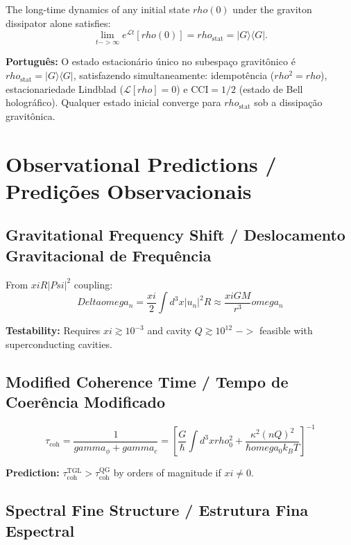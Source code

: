 \documentclass[12pt,a4paper]{article}
\def\Psi{Psi}%
\def\to{ -> }%
\def\gamma{gamma}%
\def\xi{xi}%
\def\rho{rho}%
\def\omega{omega}%
\def\Delta{Delta}%
\begin{document}
The long-time dynamics of any initial state $\rho(0)$ under the graviton dissipator alone satisfies:
\begin{equation}
\lim_{t\to\infty} e^{\mathcal{L}t}[\rho(0)] = \rho_{\mathrm{stat}} = |G\rangle\langle G|.
\end{equation}

\textbf{Português:} O estado estacionário único no subespaço gravitônico é $\rho_{\text{stat}} = |G\rangle\langle G|$, satisfazendo simultaneamente: idempotência ($\rho^2=\rho$), estacionariedade Lindblad ($\mathcal{L}[\rho]=0$) e CCI$=1/2$ (estado de Bell holográfico). Qualquer estado inicial converge para $\rho_{\text{stat}}$ sob a dissipação gravitônica.

\section{Observational Predictions / Predições Observacionais}

\subsection{Gravitational Frequency Shift / Deslocamento Gravitacional de Frequência}

From $\xi R|\Psi|^2$ coupling:
\begin{equation}
\Delta\omega_n = \frac{\xi}{2}\int d^3x |u_n|^2 R \approx \frac{\xi GM}{r^3}\omega_n
\end{equation}

\textbf{Testability:} Requires $\xi \gtrsim 10^{-3}$ and cavity $Q \gtrsim 10^{12}$ $\to$ feasible with superconducting cavities.

\subsection{Modified Coherence Time / Tempo de Coerência Modificado}

\begin{equation}
\tau_{\text{coh}} = \frac{1}{\gamma_\phi + \gamma_c} = \left[\frac{G}{\hbar}\int d^3x \rho_0^2 + \frac{\kappa^2(nQ)^2}{\hbar\omega_0 k_B T}\right]^{-1}
\end{equation}

\textbf{Prediction:} $\tau_{\text{coh}}^{\text{TGL}} > \tau_{\text{coh}}^{\text{QG}}$ by orders of magnitude if $\xi \neq 0$.

\subsection{Spectral Fine Structure / Estrutura Fina Espectral}
\end{document}

